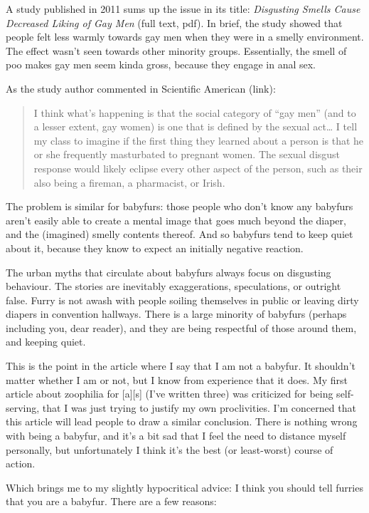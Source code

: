 A study published in 2011 sums up the issue in its title: \textit{Disgusting Smells Cause Decreased Liking of Gay Men} (full text, pdf). In brief, the study showed that people felt less warmly towards gay men when they were in a smelly environment. The effect wasn't seen towards other minority groups. Essentially, the smell of poo makes gay men seem kinda gross, because they engage in anal sex.

As the study author commented in Scientific American (link):

\begin{quote}
  I think what's happening is that the social category of ``gay men'' (and to a lesser extent, gay women) is one that is defined by the sexual act… I tell my class to imagine if the first thing they learned about a person is that he or she frequently masturbated to pregnant women. The sexual disgust response would likely eclipse every other aspect of the person, such as their also being a fireman, a pharmacist, or Irish.
\end{quote}

The problem is similar for babyfurs: those people who don't know any babyfurs aren't easily able to create a mental image that goes much beyond the diaper, and the (imagined) smelly contents thereof. And so babyfurs tend to keep quiet about it, because they know to expect an initially negative reaction.

The urban myths that circulate about babyfurs always focus on disgusting behaviour. The stories are inevitably exaggerations, speculations, or outright false. Furry is not awash with people soiling themselves in public or leaving dirty diapers in convention hallways. There is a large minority of babyfurs (perhaps including you, dear reader), and they are being respectful of those around them, and keeping quiet.

This is the point in the article where I say that I am not a babyfur. It shouldn't matter whether I am or not, but I know from experience that it does. My first article about zoophilia for [a][s] (I've written three) was criticized for being self-serving, that I was just trying to justify my own proclivities. I'm concerned that this article will lead people to draw a similar conclusion. There is nothing wrong with being a babyfur, and it's a bit sad that I feel the need to distance myself personally, but unfortunately I think it's the best (or least-worst) course of action.

Which brings me to my slightly hypocritical advice: I think you should tell furries that you are a babyfur. There are a few reasons:

